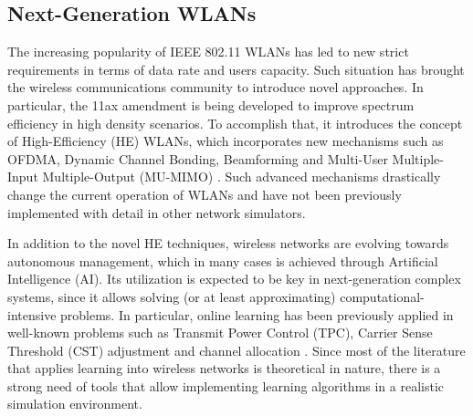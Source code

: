 \documentclass[a4paper]{article}
\begin{document}
	\subsection{Next-Generation WLANs}
	\label{section:ng_wlans}
	The increasing popularity of IEEE 802.11 WLANs has led to new strict requirements in terms of data rate and users capacity. Such situation has brought the wireless communications community to introduce novel approaches. In particular, the 11ax amendment is being developed to improve spectrum efficiency in high density scenarios. To accomplish that, it introduces the concept of High-Efficiency (HE) WLANs, which incorporates new mechanisms such as OFDMA, Dynamic Channel Bonding, Beamforming and Multi-User Multiple-Input Multiple-Output (MU-MIMO) \cite{bellalta2016ieee}. Such advanced mechanisms drastically change the current operation of WLANs and have not been previously implemented with detail in other network simulators. 
	
	In addition to the novel HE techniques, wireless networks are evolving towards autonomous management, which in many cases is achieved through Artificial Intelligence (AI). Its utilization is expected to be key in next-generation complex systems, since it allows solving (or at least approximating) computational-intensive problems. In particular, online learning has been previously applied in well-known problems such as Transmit Power Control (TPC), Carrier Sense Threshold (CST) adjustment and channel allocation \cite{wilhelmi2017implications, wilhelmi2017collaborative, maghsudi2015joint, maghsudi2015channel}. Since most of the literature that applies learning into wireless networks is theoretical in nature, there is a strong need of tools that allow implementing learning algorithms in a realistic simulation environment.	
	
\end{document}
